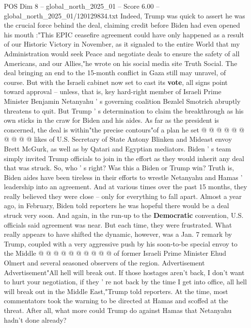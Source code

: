 \begin{textsample}{POS Dim 8 – global\_north\_2025\_01 – Score 6.00 – global\_north\_2025\_01/120129834.txt}  \label{ex:f8_pos_298}
Indeed, Trump was quick to assert he was the crucial force behind the deal, claiming credit before Biden had even opened his mouth :"This EPIC ceasefire agreement could have only happened as a result of our Historic Victory in November, as it signaled to the entire World that my Administration would seek Peace and negotiate deals to ensure the safety of all Americans, and our Allies,"he wrote on his social media site Truth Social.
The deal bringing an end to the 15-month conflict in Gaza still may unravel, of course.
But with the Israeli cabinet now set to cast its \textbf{vote}, all signs point toward approval -- unless, that is, key hard-right member of Israeli Prime Minister Benjamin Netanyahu ' s governing coalition Bezalel Smotrich abruptly threatens to quit.
But Trump ' s determination to claim the breakthrough as his own sticks in the craw for Biden and his aides.
As far as the president is concerned, the deal is within"the precise contours"of a plan he set @ @ @ @ @ @ @ @ @ @ likes of U.S.
Secretary of State Antony Blinken and Mideast envoy Brett McGurk, as well as by Qatari and Egyptian mediators.
Biden ' s team simply invited Trump officials to join in the effort as they would inherit any deal that was struck.
So, who ' s right?
Was this a Biden or Trump win?
Truth is, Biden aides have been tireless in their efforts to wrestle Netanyahu and Hamas ' leadership into an agreement.
And at various times over the past 15 months, they really believed they were close -- only for everything to fall apart.
Almost a year ago, in February, Biden told reporters he was hopeful there would be a deal struck very soon.
And again, in the run-up to the \textbf{Democratic} convention, U.S. officials said agreement was near.
But each time, they were frustrated.
What really appears to have shifted the dynamic, however, was a Jan. 7 remark by Trump, coupled with a very aggressive push by his soon-to-be special envoy to the Middle @ @ @ @ @ @ @ @ @ @ of former Israeli Prime Minister Ehud Olmert and several seasoned observers of the region.
Advertisement Advertisement"All hell will break out.
If those hostages aren't back, I don't want to hurt your negotiation, if they ' re not back by the time I get into office, all hell will break out in the Middle East,"Trump told reporters.
At the time, most commentators took the warning to be directed at Hamas and scoffed at the threat.
After all, what more could Trump do against Hamas that Netanyahu hadn't done already?

\end{textsample}
